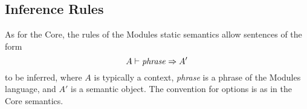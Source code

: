 





\subsection{Inference Rules}
\label{statmod-rules-sec}
As for the Core, the rules of the Modules static semantics allow
sentences of the form
\[ A\vdash{\it phrase}\Rightarrow A'\]
to be inferred, where  $A$ is typically a context, {\it phrase} is a phrase of
the Modules language,
and $A'$ is a semantic object.  The convention for options
is as in the Core semantics. 







